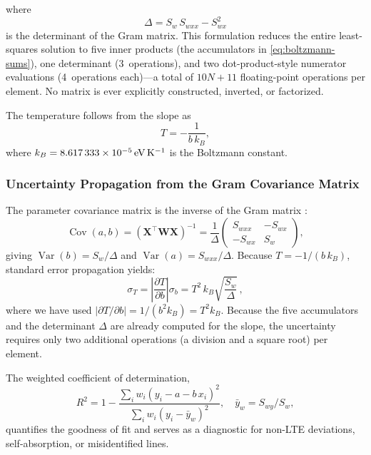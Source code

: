 where
\begin{equation}
  \Delta = S_w\, S_{wxx} - S_{wx}^2
  \label{eq:boltzmann-det}
\end{equation}
is the determinant of the Gram matrix.
This formulation reduces the entire least-squares solution to five inner products (the accumulators in \cref{eq:boltzmann-sums}), one determinant (3~operations), and two dot-product-style numerator evaluations (4~operations each)---a total of $10N + 11$ floating-point operations per element.
No matrix is ever explicitly constructed, inverted, or factorized.

The temperature follows from the slope as
\begin{equation}
  T = -\frac{1}{b\, k_B},
  \label{eq:boltzmann-temperature}
\end{equation}
where $k_B = \SI{8.617\,333e-5}{\electronvolt\per\kelvin}$ is the Boltzmann constant.

\subsubsection{Uncertainty Propagation from the Gram Covariance Matrix}
\label{sec:boltzmann-uncertainty}

The parameter covariance matrix is the inverse of the Gram matrix \citep[ch.~6]{Bevington2003}:
\begin{equation}
  \operatorname{Cov}(a, b) = (\bm{X}^\top \bm{W} \bm{X})^{-1}
  = \frac{1}{\Delta}
  \begin{pmatrix}
    S_{wxx}  & -S_{wx} \\
    -S_{wx}  & S_w
  \end{pmatrix},
  \label{eq:boltzmann-covariance}
\end{equation}
giving $\operatorname{Var}(b) = S_w / \Delta$ and $\operatorname{Var}(a) = S_{wxx} / \Delta$.
Because $T = -1/(b\, k_B)$, standard error propagation yields:
\begin{equation}
  \sigma_T = \left|\frac{\partial T}{\partial b}\right| \sigma_b
  = T^2\, k_B \sqrt{\frac{S_w}{\Delta}}\,,
  \label{eq:boltzmann-sigma-T}
\end{equation}
where we have used $|\partial T / \partial b| = 1/(b^2 k_B) = T^2 k_B$.
Because the five accumulators and the determinant $\Delta$ are already computed for the slope, the uncertainty requires only two additional operations (a division and a square root) per element.

The weighted coefficient of determination,
\begin{equation}
  R^2 = 1 - \frac{\sum_i w_i (y_i - a - b\, x_i)^2}{\sum_i w_i (y_i - \bar{y}_w)^2},
  \quad \bar{y}_w = S_{wy} / S_w,
  \label{eq:boltzmann-R2}
\end{equation}
quantifies the goodness of fit and serves as a diagnostic for non-LTE deviations, self-absorption, or misidentified lines.

